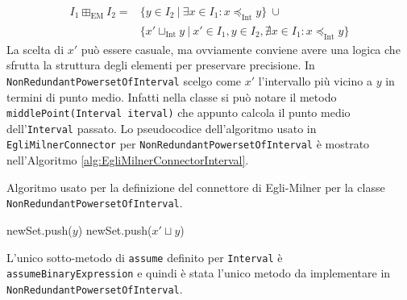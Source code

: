 \begin{align*}
 I_1 \boxplus_{\textrm{EM}} I_2 = &\{ y \in I_2\ |\ \exists x \in I_1 : x \preceq_{\textrm{Int}} y \}\ \cup \\
 &\{ x' \sqcup_{\textrm{Int}} y\ |\ x' \in I_1, y \in I_2, \nexists x \in I_1 : x \preceq_{\textrm{Int}} y \}
\end{align*}
La scelta di \(x'\) può essere casuale, ma ovviamente conviene avere una logica che sfrutta la struttura degli elementi per preservare precisione. In \texttt{NonRedundantPowersetOfInterval} scelgo come \(x'\) l'intervallo più vicino a \(y\) in termini di punto medio. Infatti nella classe si può notare il metodo \texttt{middlePoint(Interval iterval)} che appunto calcola il punto medio dell'\texttt{Interval} passato. Lo pseudocodice dell'algoritmo usato in \texttt{EgliMilnerConnector} per \texttt{NonRedundantPowersetOfInterval} è mostrato nell'Algoritmo \ref{alg:EgliMilnerConnectorInterval}.
\begin{algorithm}
	\caption{Algoritmo usato per la definizione del connettore di Egli-Milner per la classe \texttt{NonRedundantPowersetOfInterval}.}
	\label{alg:EgliMilnerConnectorInterval}
	\begin{algorithmic}[1]
                \State newSet.push({$y$})
            \Else
                \State newSet.push($x'\sqcup y$)
            \EndIf
        \EndFor
        \State {}
	\EndFunction
	\end{algorithmic}
\end{algorithm}

\noindent L'unico sotto-metodo di \texttt{assume} definito per \texttt{Interval} è \texttt{assumeBinaryExpression} e quindi è stata l'unico metodo da implementare in \texttt{NonRedundantPowersetOfInterval}.

